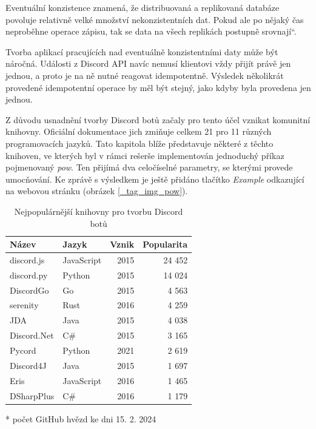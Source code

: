 \documentclass[FM]{tulthesis}
\begin{document}
	Eventuální konzistence znamená, že distribuovaná a replikovaná databáze povoluje relativně velké množství nekonzistentních dat. Pokud ale po nějaký čas neproběhne operace zápisu, tak se data na všech replikách postupně \quotedblbase srovnají\textquotedblleft. \cite{book_distributedSystems4}
	
	Tvorba aplikací pracujících nad eventuálně konzistentními daty může být náročná. Události z Discord API navíc nemusí klientovi vždy přijít právě jen jednou, a proto je na ně nutné reagovat idempotentně. Výsledek několikrát provedené idempotentní operace by měl být stejný, jako kdyby byla provedena jen jednou. \cite{book_distributedSystemsUnderstanding}
	
	Z důvodu usnadnění tvorby Discord botů začaly pro tento účel vznikat komunitní knihovny. Oficiální dokumentace jich zmiňuje celkem 21 pro 11 různých programovacích jazyků. Tato kapitola blíže představuje některé z těchto knihoven, ve kterých byl v rámci rešerše implementován jednoduchý příkaz pojmenovaný \textit{pow}. Ten přijímá dva celočíselné parametry, se kterými provede umocňování. Ke zprávě s výsledkem je ještě přidáno tlačítko \textit{Example} odkazující na webovou stránku (obrázek \ref{_tag_img_pow}).
	
	\begin{table}[ht]
		\centering
		\caption{Nejpopulárnější knihovny pro tvorbu Discord botů}\medskip
		\begin{threeparttable}
			\begin{tabular}{ l l r r }
				\textbf{Název} & \textbf{Jazyk} & \textbf{Vznik} & \textbf{Popularita}\tnote{*} \\\hline
				discord.js	& JavaScript 	& 2015 & 24 452 \\
				discord.py	& Python		& 2015 & 14 024 \\
				DiscordGo	& Go			& 2015 & 4 563 \\
				serenity	& Rust			& 2016 & 4 259 \\
				JDA			& Java			& 2015 & 4 038 \\
				Discord.Net & C\#			& 2015 & 3 165 \\
				Pycord		& Python		& 2021 & 2 619 \\
				Discord4J	& Java			& 2015 & 1 697 \\
				Eris		& JavaScript	& 2016 & 1 465 \\
				DSharpPlus	& C\#			& 2016 & 1 179 \\
			\hline\end{tabular}
			\begin{tablenotes}
				\item[*] počet GitHub hvězd ke dni 15. 2. 2024
			\end{tablenotes}
		\end{threeparttable}
	\end{table}
	
\end{document}
